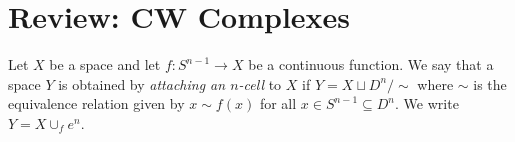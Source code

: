 

\chapter{Review: CW Complexes}
\thispagestyle{firststyle}

\begin{definition}
Let $X$ be a space and let $f\colon S^{n-1} \to X$ be a continuous function. 
We say that a space $Y$ is obtained by \emph{attaching an $n$-cell}
to $X$ if $Y = X \sqcup D^{n}/{\sim}$
where $\sim$ is the equivalence relation given by $x\sim f(x)$ for all $x\in S^{n-1}\subseteq D^{n}$. 
We write $Y = X \cup_{f} e^{n}$. 


\end{definition}


